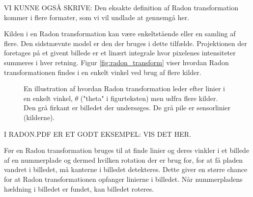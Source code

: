 VI KUNNE OGSÅ SKRIVE: Den eksakte definition af Radon transformation kommer i flere formater, som vi vil undlade at gennemgå her.


Kilden i en Radon transformation kan være enkeltstående eller en samling af flere. Den sidstnævnte model er den der bruges i dette tilfælde. Projektionen der foretages på et givent billede er et linært integrale hvor pixelenes intensiteter summeres i hver retning. Figur \vref{fig:radon_transform} viser hvordan Radon transformationen findes i en enkelt vinkel ved brug af flere kilder.

\begin{figure}[htp]
  \centering
  \caption{En illustration af hvordan Radon transformation leder efter linier i en enkelt vinkel, $\theta$ ("theta" i figurteksten) men udfra flere kilder. Den grå firkant er billedet der undersøges. De grå pile er sensorlinier (kilderne).\cite{matlab_radon}}
  \label{fig:radon_transform}
\end{figure}

I RADON.PDF ER ET GODT EKSEMPEL: VIS DET HER.

Før en Radon transformation bruges til at finde linier og deres vinkler i et billede af en nummerplade og dermed hvilken rotation der er brug for, for at få pladen vandret i billedet, må kanterne i billedet detekteres. Dette giver en større chance for at Radon transformationen opfanger linierne i billedet. Når nummerpladens hældning i billedet er fundet, kan billedet roteres.

